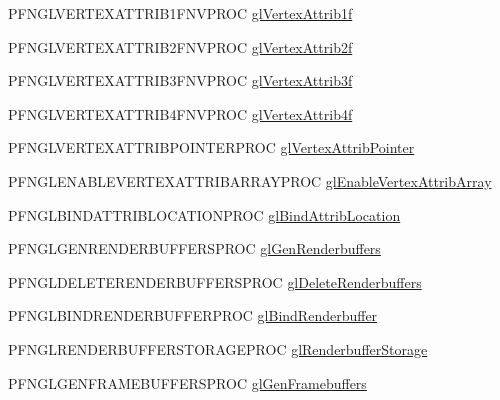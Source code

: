 \begin{DoxyCompactItemize}
\item 
P\+F\+N\+G\+L\+V\+E\+R\+T\+E\+X\+A\+T\+T\+R\+I\+B1\+F\+N\+V\+P\+R\+O\+C \hyperlink{class_agmd_1_1_g_l_context_a6641d1565ca31e3c1e14cb6ab7f9e935}{gl\+Vertex\+Attrib1f}
\item 
P\+F\+N\+G\+L\+V\+E\+R\+T\+E\+X\+A\+T\+T\+R\+I\+B2\+F\+N\+V\+P\+R\+O\+C \hyperlink{class_agmd_1_1_g_l_context_a414599f03dc38969a16aefb5163d22fb}{gl\+Vertex\+Attrib2f}
\item 
P\+F\+N\+G\+L\+V\+E\+R\+T\+E\+X\+A\+T\+T\+R\+I\+B3\+F\+N\+V\+P\+R\+O\+C \hyperlink{class_agmd_1_1_g_l_context_aa0e85112a7e6e01b44b66ad3417b3041}{gl\+Vertex\+Attrib3f}
\item 
P\+F\+N\+G\+L\+V\+E\+R\+T\+E\+X\+A\+T\+T\+R\+I\+B4\+F\+N\+V\+P\+R\+O\+C \hyperlink{class_agmd_1_1_g_l_context_a80a513502360f52fb4dd391188c8359b}{gl\+Vertex\+Attrib4f}
\item 
P\+F\+N\+G\+L\+V\+E\+R\+T\+E\+X\+A\+T\+T\+R\+I\+B\+P\+O\+I\+N\+T\+E\+R\+P\+R\+O\+C \hyperlink{class_agmd_1_1_g_l_context_ab40509891de942840d5a0a2424729679}{gl\+Vertex\+Attrib\+Pointer}
\item 
P\+F\+N\+G\+L\+E\+N\+A\+B\+L\+E\+V\+E\+R\+T\+E\+X\+A\+T\+T\+R\+I\+B\+A\+R\+R\+A\+Y\+P\+R\+O\+C \hyperlink{class_agmd_1_1_g_l_context_a0284210175ec882ecdaf8d2a4f4c15b4}{gl\+Enable\+Vertex\+Attrib\+Array}
\item 
P\+F\+N\+G\+L\+B\+I\+N\+D\+A\+T\+T\+R\+I\+B\+L\+O\+C\+A\+T\+I\+O\+N\+P\+R\+O\+C \hyperlink{class_agmd_1_1_g_l_context_a98614c452a35d636f958503c6f773fde}{gl\+Bind\+Attrib\+Location}
\item 
P\+F\+N\+G\+L\+G\+E\+N\+R\+E\+N\+D\+E\+R\+B\+U\+F\+F\+E\+R\+S\+P\+R\+O\+C \hyperlink{class_agmd_1_1_g_l_context_ae206052236a67e7c60e82a1f7cfa127e}{gl\+Gen\+Renderbuffers}
\item 
P\+F\+N\+G\+L\+D\+E\+L\+E\+T\+E\+R\+E\+N\+D\+E\+R\+B\+U\+F\+F\+E\+R\+S\+P\+R\+O\+C \hyperlink{class_agmd_1_1_g_l_context_ac4f1b21d9928f2ebda0e83cc0e2359bb}{gl\+Delete\+Renderbuffers}
\item 
P\+F\+N\+G\+L\+B\+I\+N\+D\+R\+E\+N\+D\+E\+R\+B\+U\+F\+F\+E\+R\+P\+R\+O\+C \hyperlink{class_agmd_1_1_g_l_context_aa936a7a543eef2e1b62450ff0f64bff5}{gl\+Bind\+Renderbuffer}
\item 
P\+F\+N\+G\+L\+R\+E\+N\+D\+E\+R\+B\+U\+F\+F\+E\+R\+S\+T\+O\+R\+A\+G\+E\+P\+R\+O\+C \hyperlink{class_agmd_1_1_g_l_context_aea8f30d29c92e04629eeb1d626bffbb5}{gl\+Renderbuffer\+Storage}
\item 
P\+F\+N\+G\+L\+G\+E\+N\+F\+R\+A\+M\+E\+B\+U\+F\+F\+E\+R\+S\+P\+R\+O\+C \hyperlink{class_agmd_1_1_g_l_context_acfbcb7e199b5daaf0395a888527d80df}{gl\+Gen\+Framebuffers}

\end{DoxyCompactItemize}
